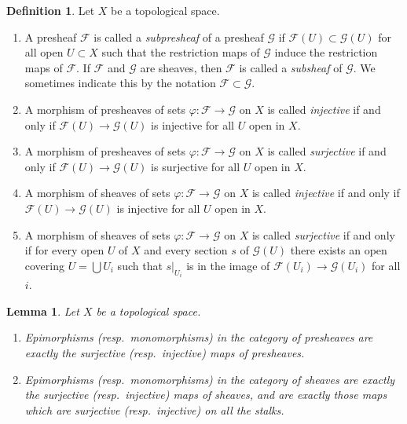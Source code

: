 \documentclass{stacks-project}
\theoremstyle{plain}
\newtheorem{lemma}[subsection]{Lemma}
\theoremstyle{definition}
\newtheorem{definition}[subsection]{Definition}
\theoremstyle{remark}
\numberwithin{equation}{subsection}
\begin{document}
\begin{definition}
\label{definition-injective-surjective}
Let $X$ be a topological space.
\begin{enumerate}
\item A presheaf $\mathcal{F}$ is called a {\it subpresheaf} of a presheaf
$\mathcal{G}$ if $\mathcal{F}(U) \subset \mathcal{G}(U)$ for all open
$U \subset X$ such that the restriction maps of $\mathcal{G}$ induce the
restriction maps of $\mathcal{F}$. If $\mathcal{F}$ and
$\mathcal{G}$ are sheaves, then $\mathcal{F}$ is called a {\it subsheaf}
of $\mathcal{G}$. We sometimes indicate this by the notation
$\mathcal{F} \subset \mathcal{G}$.
\item A morphism of presheaves of sets $\varphi : \mathcal{F} \to \mathcal{G}$
on $X$ is called {\it injective} if and only if
$\mathcal{F}(U) \to \mathcal{G}(U)$ is injective for all $U$ open in $X$.
\item A morphism of presheaves of sets $\varphi : \mathcal{F} \to \mathcal{G}$
on $X$ is called {\it surjective} if and only if
$\mathcal{F}(U) \to \mathcal{G}(U)$ is surjective for all $U$ open in $X$.
\item A morphism of sheaves of sets $\varphi : \mathcal{F} \to \mathcal{G}$
on $X$ is called {\it injective} if and only if
$\mathcal{F}(U) \to \mathcal{G}(U)$ is injective for all $U$ open in $X$.
\item A morphism of sheaves of sets $\varphi : \mathcal{F} \to \mathcal{G}$
on $X$ is called {\it surjective} if and only if for every open
$U$ of $X$ and every section $s$ of $\mathcal{G}(U)$ there exists an
open covering $U = \bigcup U_i$ such that $s|_{U_i}$ is in
the image of $\mathcal{F}(U_i) \to \mathcal{G}(U_i)$ for all $i$.
\end{enumerate}
\end{definition}


\begin{lemma}
\label{lemma-characterize-epi-mono}
Let $X$ be a topological space.
\begin{enumerate}
\item Epimorphisms (resp.\ monomorphisms) in the category of
presheaves are exactly the surjective (resp.\ injective) maps
of presheaves.
\item Epimorphisms (resp.\ monomorphisms) in the category of
sheaves are exactly the surjective (resp.\ injective) maps
of sheaves, and are exactly those maps which are surjective
(resp.\ injective) on all the stalks.
\end{enumerate}
\end{lemma}
\end{document}
